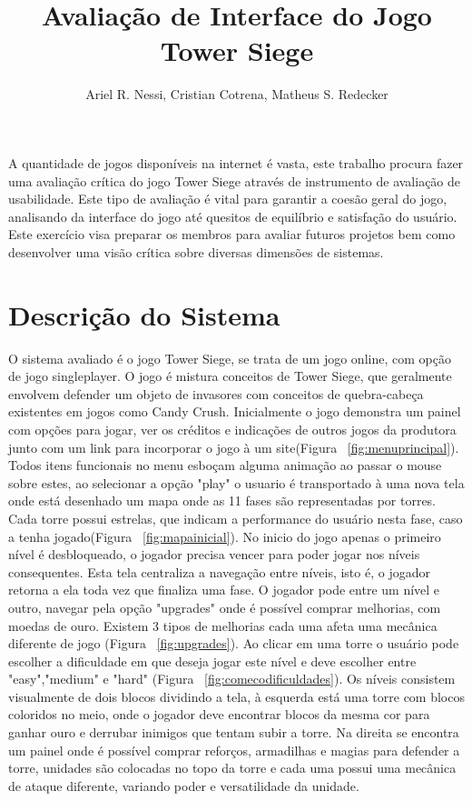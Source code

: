 \documentclass[12pt]{article}
\title{Avaliação de Interface do Jogo Tower Siege}
\author{Ariel R. Nessi\inst{1}, Cristian Cotrena\inst{1}, Matheus S. Redecker\inst{1} }
\begin{document}
 

\maketitle

\begin{resumo} 
  A quantidade de jogos disponíveis na internet é vasta, este trabalho procura fazer uma avaliação crítica do jogo Tower Siege através de instrumento de avaliação de usabilidade. Este tipo de avaliação é vital para garantir a coesão geral do jogo, analisando da interface do jogo até quesitos de equilíbrio e satisfação do usuário. Este exercício visa preparar os membros para avaliar futuros projetos bem como desenvolver uma visão crítica sobre diversas dimensões de sistemas.
\end{resumo}


\section{Descrição do Sistema}

O sistema avaliado é o jogo Tower Siege, se trata de um jogo online, com opção de jogo singleplayer. O jogo é mistura conceitos de Tower Siege, que geralmente envolvem defender um objeto de invasores com conceitos de quebra-cabeça existentes em jogos como Candy Crush. Inicialmente o jogo demonstra um painel com opções para jogar, ver os créditos e indicações de outros jogos da produtora junto com um link para incorporar o jogo à um site(Figura ~\ref{fig:menuprincipal}).\\
Todos itens funcionais no menu esboçam alguma animação ao passar o mouse sobre estes, ao selecionar a opção "play" o usuario é transportado à uma nova tela onde está desenhado um mapa onde as 11 fases são representadas por torres. Cada torre possui estrelas, que indicam a performance do usuário nesta fase, caso a tenha jogado(Figura ~\ref{fig:mapainicial}).
No inicio do jogo apenas o primeiro nível é desbloqueado, o jogador precisa vencer para poder jogar nos níveis consequentes. 
Esta tela centraliza a navegação entre níveis, isto é, o jogador retorna a ela toda vez que finaliza uma fase. 
O jogador pode entre um nível e outro, 
navegar pela opção "upgrades" onde é possível comprar melhorias, com moedas de ouro. 
Existem 3 tipos de melhorias cada uma afeta uma mecânica diferente de jogo (Figura ~\ref{fig:upgrades}).
Ao clicar em uma torre o usuário pode escolher a dificuldade em que deseja jogar este nível e deve escolher entre "easy","medium" e "hard" (Figura ~\ref{fig:comecodificuldades}).
Os níveis consistem visualmente de dois blocos dividindo a tela, à esquerda está uma torre com blocos coloridos no meio, onde o jogador deve encontrar blocos da mesma cor para ganhar ouro e derrubar inimigos que tentam subir a torre. Na direita se encontra um painel onde é possível comprar reforços, armadilhas e magias para defender a torre, unidades são colocadas no topo da torre e cada uma possui uma mecânica de ataque diferente, variando poder e versatilidade da unidade.
\end{document}
